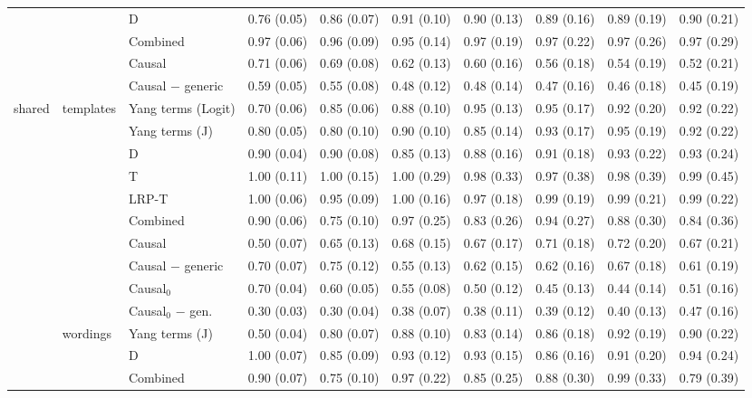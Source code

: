 \begin{tabular}{@{}lllrrrrrrr@{}}
 &  & D & 0.76 (0.05) & 0.86 (0.07) & 0.91 (0.10) & 0.90 (0.13) & 0.89 (0.16) & 0.89 (0.19) & 0.90 (0.21) \\
 &  & Combined & 0.97 (0.06) & 0.96 (0.09) & 0.95 (0.14) & 0.97 (0.19) & 0.97 (0.22) & 0.97 (0.26) & 0.97 (0.29) \\
 &  & Causal & 0.71 (0.06) & 0.69 (0.08) & 0.62 (0.13) & 0.60 (0.16) & 0.56 (0.18) & 0.54 (0.19) & 0.52 (0.21) \\
 &  & Causal $-$ generic & 0.59 (0.05) & 0.55 (0.08) & 0.48 (0.12) & 0.48 (0.14) & 0.47 (0.16) & 0.46 (0.18) & 0.45 (0.19) \\
\addlinespace
shared & templates & Yang terms (Logit) & 0.70 (0.06) & 0.85 (0.06) & 0.88 (0.10) & 0.95 (0.13) & 0.95 (0.17) & 0.92 (0.20) & 0.92 (0.22) \\
 &  & Yang terms (J) & 0.80 (0.05) & 0.80 (0.10) & 0.90 (0.10) & 0.85 (0.14) & 0.93 (0.17) & 0.95 (0.19) & 0.92 (0.22) \\
 &  & D & 0.90 (0.04) & 0.90 (0.08) & 0.85 (0.13) & 0.88 (0.16) & 0.91 (0.18) & 0.93 (0.22) & 0.93 (0.24) \\
 &  & T & 1.00 (0.11) & 1.00 (0.15) & 1.00 (0.29) & 0.98 (0.33) & 0.97 (0.38) & 0.98 (0.39) & 0.99 (0.45) \\
 &  & LRP-T & 1.00 (0.06) & 0.95 (0.09) & 1.00 (0.16) & 0.97 (0.18) & 0.99 (0.19) & 0.99 (0.21) & 0.99 (0.22) \\
 &  & Combined & 0.90 (0.06) & 0.75 (0.10) & 0.97 (0.25) & 0.83 (0.26) & 0.94 (0.27) & 0.88 (0.30) & 0.84 (0.36) \\
 &  & Causal & 0.50 (0.07) & 0.65 (0.13) & 0.68 (0.15) & 0.67 (0.17) & 0.71 (0.18) & 0.72 (0.20) & 0.67 (0.21) \\
 &  & Causal $-$ generic & 0.70 (0.07) & 0.75 (0.12) & 0.55 (0.13) & 0.62 (0.15) & 0.62 (0.16) & 0.67 (0.18) & 0.61 (0.19) \\
 &  & Causal$_0$ & 0.70 (0.04) & 0.60 (0.05) & 0.55 (0.08) & 0.50 (0.12) & 0.45 (0.13) & 0.44 (0.14) & 0.51 (0.16) \\
 &  & Causal$_0$ $-$ gen. & 0.30 (0.03) & 0.30 (0.04) & 0.38 (0.07) & 0.38 (0.11) & 0.39 (0.12) & 0.40 (0.13) & 0.47 (0.16) \\
 & wordings & Yang terms (J) & 0.50 (0.04) & 0.80 (0.07) & 0.88 (0.10) & 0.83 (0.14) & 0.86 (0.18) & 0.92 (0.19) & 0.90 (0.22) \\
 &  & D & 1.00 (0.07) & 0.85 (0.09) & 0.93 (0.12) & 0.93 (0.15) & 0.86 (0.16) & 0.91 (0.20) & 0.94 (0.24) \\
 &  & Combined & 0.90 (0.07) & 0.75 (0.10) & 0.97 (0.22) & 0.85 (0.25) & 0.88 (0.30) & 0.99 (0.33) & 0.79 (0.39) \\

\end{tabular}
